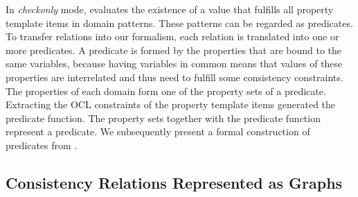 In \emph{checkonly} mode, \qvtr evaluates the existence of a value that fulfills all property template items in domain patterns. These patterns can be regarded as predicates. %
To transfer \qvtr relations into our formalism, each relation is translated into one or more predicates.
A predicate is formed by the properties that are bound to the same \qvtr variables, because having \qvtr variables in common means that values of these properties are interrelated and thus need to fulfill some consistency constraints.
The properties of each domain form one of the property sets of a predicate.
Extracting the \gls{OCL} constraints of the property template items generated the predicate function. 
The property sets together with the predicate function represent a predicate. 
We subsequently present a formal construction of predicates from \qvtr.



\subsection{Consistency Relations Represented as Graphs}


